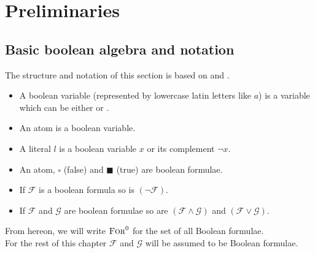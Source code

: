 \chapter{Preliminaries}
\section{Basic boolean algebra and notation}
The structure and notation of this section is based on \cite{Marques-Silva-PropositionalSATSolving} and \cite{fondements-logique}.
\begin{definition}

\begin{itemize}
    \item A boolean variable (represented by lowercase latin letters like $a$) is a variable which can be either \true or \false.
    \item An atom is a boolean variable.
    \item A literal $l$ is a boolean variable $x$ or its complement $\neg x$.
\end{itemize}

\end{definition}
\begin{definition}
\begin{itemize}
    \item An atom, $\square$ (false) and $\blacksquare$ (true)  are boolean formulae.
    \item If $\mathcal{F}$ is a boolean formula so is $\left(\neg\mathcal{F}\right)$.
    \item If $\mathcal{F}$ and $\mathcal{G}$ are boolean formulae so are $\left(\mathcal{F} \land \mathcal{G}\right)$ and $\left(\mathcal{F} \lor \mathcal{G}\right)$.
\end{itemize}
From hereon, we will write $\textsc{For}^0$ for the set of all Boolean formulae.\\
For the rest of this chapter $\mathcal{F}$ and $\mathcal{G}$ will be assumed to be Boolean formulae.

\end{definition}
